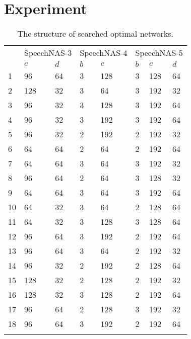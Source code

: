 \documentclass{article}
\begin{document}
\section{Experiment}\label{sec:exper}
\begin{table}[t]
  \caption{The structure of searched optimal networks.}
  \centering
  \begin{tabular}{l|ll|ll|lll}
  \Xhline{2\arrayrulewidth}
    \multirow{2}{*}{Layer} & \multicolumn{2}{c|}{SpeechNAS-3} & \multicolumn{2}{c|}{SpeechNAS-4} & \multicolumn{3}{c}{SpeechNAS-5} \\
    \cline{2-8}
    &$c$ &$d$ &$b$ &$c$ &$b$ &$c$ &$d$ \\
    \Xhline{1.5\arrayrulewidth}
    1 & 96 & 64 &3 &128 & 3 & 128 & 64 \\
    2 & 128 & 32 &3 &64 & 3 & 192 & 32 \\
    3 & 96 & 32 &3 &128 & 3 & 192 & 64 \\
    4 & 96 & 32 &3 &192 & 3 & 192 & 64 \\ \hline
    5 & 96 & 32 &2 &192 & 2 & 192 & 32 \\
    6 & 64 & 64 &2 &64 & 2 & 192 & 64 \\
    7 & 64 & 64 &3 &64 & 3 & 192 & 32 \\
    8 & 96 & 64 &2 &64 & 3 & 128 & 32 \\
    9 & 64 & 64 &3 &64 & 3 & 192 & 64 \\
    10 & 64 & 32 &3 &64 & 2 & 128 & 64 \\
    11 & 64 & 32 &3 &128 & 3 & 128 & 64 \\
    12 & 96 & 64 &3 &192 & 2 & 192 & 64 \\
    13 & 96 & 64 &3 &64 & 2 & 192 & 32 \\
    14 & 96 & 32 &2 &192 & 2 & 128 & 64 \\
    15 & 128 & 32 &2 &128 & 2 & 192 & 32 \\
    16 & 128 & 32 &3 &128 & 2 & 192 & 64 \\
    17 & 96 & 64 &2 &128 & 3 & 192 & 32 \\
    18 & 96 & 64 &3 &192 & 2 & 192 & 64 \\
    \Xhline{2\arrayrulewidth}
  \end{tabular}\label{tab:network}
\end{table}
\end{document}
